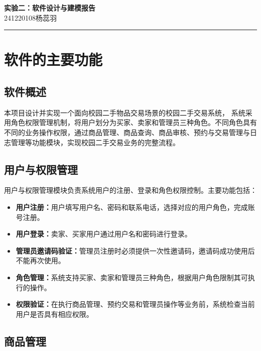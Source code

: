 \documentclass[12pt,a4paper]{article}
\begin{document}
	
	\begin{center}
		{\LARGE \textbf{实验二：软件设计与建模报告}} \\[0.5cm]
		{\large 241220108\quad 杨蕊羽} \\[0.5cm]
		\rule{\textwidth}{0.4pt}
	\end{center}
	
	\section{软件的主要功能}
	
	\subsection{软件概述}
	
	本项目设计并实现一个面向校园二手物品交易场景的校园二手交易系统，
	系统采用角色权限管理机制，将用户划分为买家、卖家和管理员三种角色。不同角色具有不同的业务操作权限，通过商品管理、商品查询、商品审核、预约与交易管理与日志管理等功能模块，实现校园二手交易业务的完整流程。
	
	\subsection{用户与权限管理}
	
	用户与权限管理模块负责系统用户的注册、登录和角色权限控制。主要功能包括：
	\begin{itemize}
		\item \textbf{用户注册：}用户填写用户名、密码和联系电话，选择对应的用户角色，完成账号注册。
		\item \textbf{用户登录：}卖家、买家用户通过用户名和密码进行登录。	\item \textbf{管理员邀请码验证：}管理员注册时必须提供一次性邀请码，邀请码成功使用后不能再次使用。
		\item \textbf{角色管理：}系统支持买家、卖家和管理员三种角色，根据用户角色限制其可执行的操作。
		\item \textbf{权限验证：}在执行商品管理、预约交易和管理员操作等业务前，系统检查当前用户是否具有相应权限。
	\end{itemize}
	
	\subsection{商品管理}
	
\end{document}
